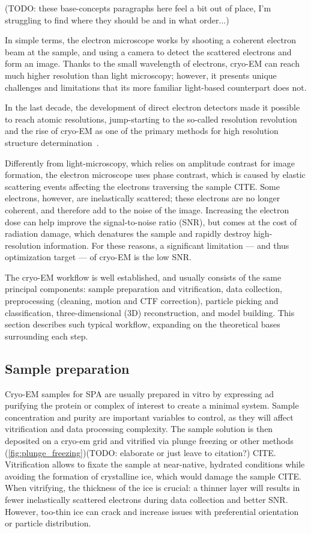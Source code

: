 (TODO: these base-concepts paragraphs here feel a bit out of place, I'm struggling to find where they should be and in what order...)

In simple terms, the electron microscope works by shooting a coherent electron beam at the sample, and using a camera to detect the scattered electrons and form an image.
Thanks to the small wavelength of electrons, cryo-EM can reach much higher resolution than light microscopy; however, it presents unique challenges and limitations that its more familiar light-based counterpart does not.

In the last decade, the development of direct electron detectors made it possible to reach atomic resolutions, jump-starting to the so-called resolution revolution and the rise of cryo-EM as one of the primary methods for high resolution structure determination~\cite{faruqiCCDDetectorsHighresolution2000}.

Differently from light-microscopy, which relies on amplitude contrast for image formation, the electron microscope uses phase contrast, which is caused by elastic scattering events affecting the electrons traversing the sample CITE.
Some electrons, however, are inelastically scattered; these electrons are no longer coherent, and therefore add to the noise of the image.
Increasing the electron dose can help improve the signal-to-noise ratio (SNR), but comes at the cost of radiation damage, which denatures the sample and rapidly destroy high-resolution information.
For these reasons, a significant limitation --- and thus optimization target --- of cryo-EM is the low SNR.

The cryo-EM workflow is well established, and usually consists of the same principal components: sample preparation and vitrification, data collection, preprocessing (cleaning, motion and CTF correction), particle picking and classification, three-dimensional (3D) reconstruction, and model building.
This section describes such typical workflow, expanding on the theoretical bases surrounding each step.

\subsection{Sample preparation}
Cryo-EM samples for SPA are usually prepared in vitro by expressing ad purifying the protein or complex of interest to create a minimal system.
Sample concentration and purity are important variables to control, as they will affect vitrification and data processing complexity.
The sample solution is then deposited on a cryo-em grid and vitrified via plunge freezing or other methods (\autoref{fig:plunge_freezing})(TODO: elaborate or just leave to citation?) CITE.
Vitrification allows to fixate the sample at near-native, hydrated conditions while avoiding the formation of crystalline ice, which would damage the sample CITE.
When vitrifying, the thickness of the ice is crucial: a thinner layer will results in fewer inelastically scattered electrons during data collection and better SNR.
However, too-thin ice can crack and increase issues with preferential orientation or particle distribution.


